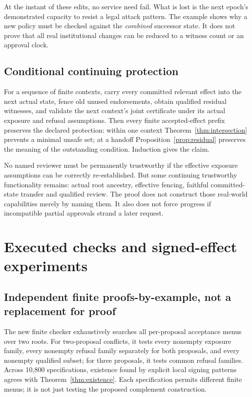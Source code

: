 \documentclass[11pt,a4paper]{article}
\theoremstyle{definition}\newtheorem{definition}{Definition}
\begin{document}
At the instant of these edits, no service need fail. What is lost is the next epoch's demonstrated capacity to resist a legal attack pattern. The example shows why a new policy must be checked against the \emph{combined} successor state. It does not prove that all real institutional changes can be reduced to a witness count or an approval clock.

\subsection{Conditional continuing protection}
For a sequence of finite contexts, carry every committed relevant effect into the next actual state, fence old unused endorsements, obtain qualified residual witnesses, and validate the next context's joint certificate under its actual exposure and refusal assumptions. Then every finite accepted-effect prefix preserves the declared protection: within one context Theorem~\ref{thm:intersection} prevents a minimal unsafe set; at a handoff Proposition~\ref{prop:residual} preserves the meaning of the outstanding condition. Induction gives the claim.

No named reviewer must be permanently trustworthy if the effective exposure assumptions can be correctly re-established. But some continuing trustworthy functionality remains: actual root ancestry, effective fencing, faithful committed-state transfer and qualified review. The proof does not construct those real-world capabilities merely by naming them. It also does not force progress if incompatible partial approvals strand a later request.

\section{Executed checks and signed-effect experiments}
\label{sec:tests}
\subsection{Independent finite proofs-by-example, not a replacement for proof}
The new finite checker exhaustively searches all per-proposal acceptance menus over two roots. For two-proposal conflicts, it tests every nonempty exposure family, every nonempty refusal family separately for both proposals, and every nonempty qualified subset; for three proposals, it tests common refusal families. Across 10,800 specifications, existence found by explicit local signing patterns agrees with Theorem~\ref{thm:existence}. Each specification permits different finite menus; it is not just testing the proposed complement construction.
\end{document}
